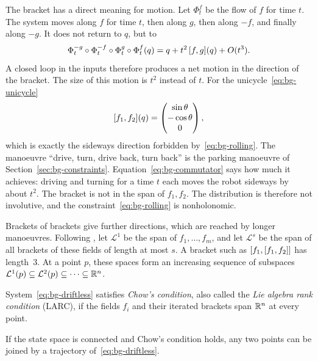 The bracket has a direct meaning for motion. Let $\Phi^f_t$ be the flow of $f$
for time $t$. The system moves along $f$ for time $t$, then along $g$, then
along $-f$, and finally along $-g$. It does not return to $q$, but to
\begin{equation}
  \Phi^{-g}_t\circ\Phi^{-f}_t\circ\Phi^{g}_t\circ\Phi^{f}_t(q)
  =q+t^2\,[f,g](q)+O(t^3).
  \label{eq:bg-commutator}
\end{equation}
A closed loop in the inputs therefore produces a net motion in the direction
of the bracket. The size of this motion is $t^2$ instead of $t$. For the unicycle~\eqref{eq:bg-unicycle}
\begin{equation}
  [f_1,f_2](q)=\begin{pmatrix}\sin\theta\\ -\cos\theta\\ 0\end{pmatrix},
  \label{eq:bg-unicycle-bracket}
\end{equation}
which is exactly the sideways direction forbidden by~\eqref{eq:bg-rolling}.
The manoeuvre ``drive, turn, drive back, turn back'' is the parking manoeuvre of
Section~\ref{sec:bg-constraints}. Equation~\eqref{eq:bg-commutator} says how much it
achieves: driving and turning for a time $t$ each moves the robot sideways
by about $t^2$. The bracket is not in the span of $f_1,f_2$. The distribution
is therefore not involutive, and the constraint~\eqref{eq:bg-rolling} is
nonholonomic.

Brackets of brackets give further directions, which are reached by longer
manoeuvres. Following \cite{bellaiche2005}, let $\mathcal L^1$ be the span of
$f_1,\dots,f_m$, and let $\mathcal L^s$ be the span of all brackets of these
fields of length at most $s$. A bracket such as $[f_1,[f_1,f_2]]$
has length~$3$. At a point $p$, these spaces form an increasing sequence of
subspaces $\mathcal L^1(p)\subseteq\mathcal L^2(p)\subseteq\dots\subseteq\mathbb{R}^n$.

\begin{definition}
System~\eqref{eq:bg-driftless} satisfies \emph{Chow's condition}, also called
the \emph{Lie algebra rank condition} (LARC), if the fields $f_i$ and their
iterated brackets span $\mathbb{R}^n$ at every point.
\end{definition}

\begin{theorem}
If the state space is connected and Chow's condition holds, any two points can
be joined by a trajectory of~\eqref{eq:bg-driftless}.
\end{theorem}

